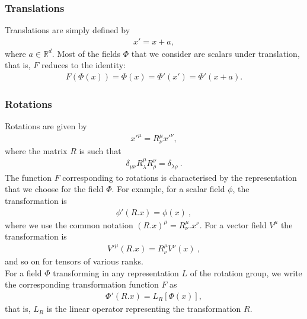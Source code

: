 \documentclass[12pt,a4paper]{report}
\begin{document}
\subsubsection{Translations}
Translations are simply defined by
\begin{align}
    x'=x+a,
\end{align}
where $a\in\mathbb{R}^d$. Most of the fields $\Phi$ that we consider are scalars under translation, that is, $F$ reduces to the identity:
\begin{align}
    F(\Phi(x))=\Phi(x)=\Phi'(x')=\Phi'(x+a).\label{1.4}
\end{align}
\subsubsection{Rotations}
Rotations are given by
\begin{align}
    x'^\mu=R^\mu_\nu x'^\nu,
\end{align}
where the matrix $R$ is such that
\begin{align}
    \delta_{\mu\nu}R^\mu_\lambda R^\nu_\rho=\delta_{\lambda\rho}~.
\end{align}
The function $F$ corresponding to rotations is characterised by the representation that we choose for the field $\Phi$. For example, for a scalar field $\phi$, the transformation is
\begin{align}
    \phi'(R.x)=\phi(x)~,
\end{align}
where we use the common notation $(R.x)^\mu=R^\mu_\nu.x^\nu$. For a vector field $V^\mu$ the transformation is
\begin{align}
    V'^\mu(R.x)=R^\mu_\nu V^\nu(x)~,
\end{align}
and so on for tensors of various ranks. \\
For a field $\Phi$ transforming in any representation $L$ of the rotation group, we write the corresponding transformation function $F$ as
\begin{align}
    \Phi'(R.x)=L_R[\Phi(x)],\label{1.9}
\end{align}
that is, $L_R$ is the linear operator representing the transformation $R$.
\end{document}
